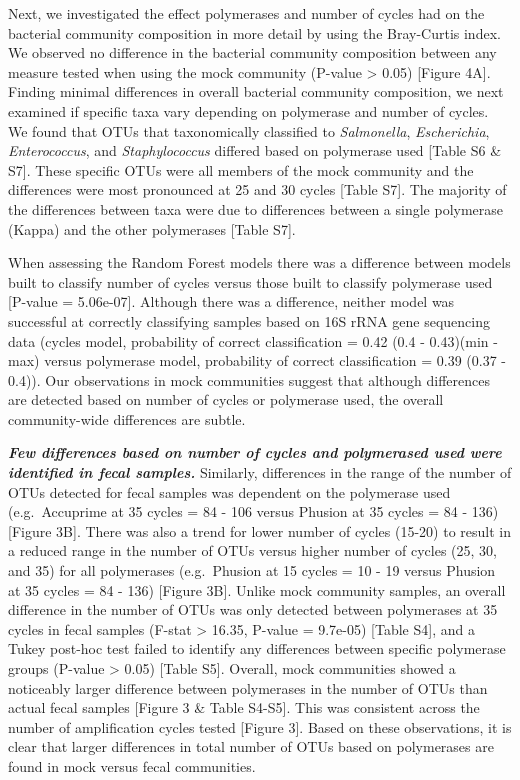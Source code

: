 \documentclass[11pt,]{article}
\begin{document}
Next, we investigated the effect polymerases and number of cycles had on
the bacterial community composition in more detail by using the
Bray-Curtis index. We observed no difference in the bacterial community
composition between any measure tested when using the mock community
(P-value \textgreater{} 0.05) {[}Figure 4A{]}. Finding minimal
differences in overall bacterial community composition, we next examined
if specific taxa vary depending on polymerase and number of cycles. We
found that OTUs that taxonomically classified to \emph{Salmonella},
\emph{Escherichia}, \emph{Enterococcus}, and \emph{Staphylococcus}
differed based on polymerase used {[}Table S6 \& S7{]}. These specific
OTUs were all members of the mock community and the differences were
most pronounced at 25 and 30 cycles {[}Table S7{]}. The majority of the
differences between taxa were due to differences between a single
polymerase (Kappa) and the other polymerases {[}Table S7{]}.

When assessing the Random Forest models there was a difference between
models built to classify number of cycles versus those built to classify
polymerase used {[}P-value = 5.06e-07{]}. Although there was a
difference, neither model was successful at correctly classifying
samples based on 16S rRNA gene sequencing data (cycles model,
probability of correct classification = 0.42 (0.4 - 0.43)(min - max)
versus polymerase model, probability of correct classification = 0.39
(0.37 - 0.4)). Our observations in mock communities suggest that
although differences are detected based on number of cycles or
polymerase used, the overall community-wide differences are subtle.

\textbf{\emph{Few differences based on number of cycles and polymerased
used were identified in fecal samples.}} Similarly, differences in the
range of the number of OTUs detected for fecal samples was dependent on
the polymerase used (e.g.~Accuprime at 35 cycles = 84 - 106 versus
Phusion at 35 cycles = 84 - 136) {[}Figure 3B{]}. There was also a trend
for lower number of cycles (15-20) to result in a reduced range in the
number of OTUs versus higher number of cycles (25, 30, and 35) for all
polymerases (e.g.~Phusion at 15 cycles = 10 - 19 versus Phusion at 35
cycles = 84 - 136) {[}Figure 3B{]}. Unlike mock community samples, an
overall difference in the number of OTUs was only detected between
polymerases at 35 cycles in fecal samples (F-stat \textgreater{} 16.35,
P-value = 9.7e-05) {[}Table S4{]}, and a Tukey post-hoc test failed to
identify any differences between specific polymerase groups (P-value
\textgreater{} 0.05) {[}Table S5{]}. Overall, mock communities showed a
noticeably larger difference between polymerases in the number of OTUs
than actual fecal samples {[}Figure 3 \& Table S4-S5{]}. This was
consistent across the number of amplification cycles tested {[}Figure
3{]}. Based on these observations, it is clear that larger differences
in total number of OTUs based on polymerases are found in mock versus
fecal communities.
\end{document}
